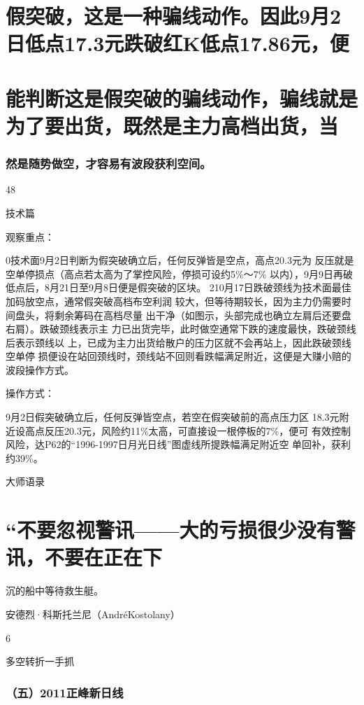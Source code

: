 \documentclass{article}
\begin{document}
\section{假突破，这是一种骗线动作。因此9月2日低点17.3元跌破红K低点17.86元，便}

\section{能判断这是假突破的骗线动作，骗线就是为了要出货，既然是主力高档出货，当}

\subsubsection{然是随势做空，才容易有波段获利空间。}

48

\clearpage

技术篇

观察重点：

0技术面9月2日判断为假突破确立后，任何反弹皆是空点，高点20.3元为 反压就是空单停损点（高点若太高为了掌控风险，停损可设约5\%～7\% 以内），9月9日再破低点后，8月21日至9月8日便是假突破的区块。 210月17日跌破颈线为技术面最佳加码放空点，通常假突破高档布空利润 较大，但等待期较长，因为主力仍需要时间盘头，将剩余筹码在高档尽量 出干净（如图示，头部完成也确立左肩后还要盘右肩）。跌破颈线表示主 力已出货完毕，此时做空通常下跌的速度最快，跌破颈线后表示颈线以 上，已成为主力出货给散户的压力区就不会再站上，因此跌破颈线空单停 损便设在站回颈线时，颈线站不回则看跌幅满足附近，这便是大赚小赔的 波段操作方式。

操作方式：

9月2日假突破确立后，任何反弹皆空点，若空在假突破前的高点压力区 18.3元附近设高点反压20.3元，风险约11\%太高，可直接设一根停板的7\%，便可 有效控制风险，达P62的“1996-1997日月光日线”图虚线所提跌幅满足附近空 单回补，获利约39\%。

大师语录

\section{“不要忽视警讯——大的亏损很少没有警讯，不要在正在下}

沉的船中等待救生艇。

安德烈·科斯托兰尼（AndréKostolany）

6

\clearpage

多空转折一手抓

\subsubsection{（五）2011正峰新日线}
\end{document}

